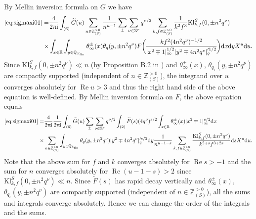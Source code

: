 \documentclass[10pt,oneside,reqno]{amsart}
\makeatletter
\newcommand\rmd{\mathrm{d}}
\newcommand\rmi{\mathrm{i}}
\newcommand\QQ{\mathbb{Q}}
\newcommand\RR{\mathbb{R}}
\newcommand\ZZ{\mathbb{Z}}
\newcommand\dpii{2\uppi\rmi}
\renewcommand\Re{\mathop{\mathrm{Re}}}
\newcommand\fin{\mathrm{fin}}
\newcommand\Kl{\mathrm{Kl}}
\newcommand\legendresymbol[2]{\genfrac{(}{)}{}{}{#1}{#2}}
\theoremstyle{THEOREM}
\theoremstyle{DEFINITION}
\theoremstyle{EXERCISE}
\numberwithin{equation}{section}
\renewenvironment{proof}[1][\proofname]{\par
  \vspace{-6pt}
  \pushQED{\qed}
  \normalfont \topsep6\p@\@plus6\p@\relax
  \trivlist
  \item[\hskip\labelsep\rmfamily\bfseries
    #1\@addpunct{:}]\ignorespaces
}{
  \popQED\endtrivlist\@endpefalse
  \vspace{-6pt}
}
\makeatother
\begin{document}
\begin{proof}
By Mellin inversion formula on $G$ we have
\begin{align*}
\eqref{eq:sigmaxi01}=&\frac{4}{\dpii} \int_{(6)}\widetilde{G}(u)\sum_{n\in \ZZ_{(S)}^{>0}}\frac{1}{n^{u-1}}\sum_{\pm}\sum_{\nu\in \ZZ^r}q^{\nu/2}\sum_{k,f\in \ZZ_{(S)}^{>0}}\frac{1}{k^2f^3}\Kl_{k,f}^S(0,\pm n^2q^\nu)\\
  \times&\int_{x\in\RR}\int_{y\in\QQ_{S_\fin}}\theta_\infty^\pm(x)\theta_{q}(y,\pm n^2q^\nu)  F\legendresymbol{kf^2(4n^2q^\nu)^{-1/2}}{|x^2\mp 1|_\infty^{1/2}|y^2\mp 4n^2q^\nu|_q'^{1/2}}\rmd x\rmd y X^u\rmd u.
\end{align*}
Since $\Kl_{k,f}^S(0,\pm n^2q^\nu)\ll n$ (by Proposition B.2 in \cite{cheng2025b}) and $\theta_\infty^\pm(x)$, $\theta_{q_i}(y,\pm n^2q^\nu)$ are compactly supported (independent of $n\in \ZZ_{(S)}^{>0}$), the integrand over $u$ converges absolutely for $\Re u>3$ and thus the right hand side of the above equation is well-defined. By Mellin inversion formula on $F$, the above equation equals
\begin{align*}
\eqref{eq:sigmaxi01}=&\frac{4}{\dpii}\frac{1}{\dpii} \int_{(6)}\widetilde{G}(u)\sum_{\pm}\sum_{\nu\in \ZZ^r}q^{\nu/2}\int_{(2)}\widetilde{F}(s)(4q^\nu)^{s/2}\int_{x\in\RR}\theta_\infty^\pm(x)|x^2\mp 1|_\infty^{s/2}\rmd x\\
  \times& \sum_{n\in \ZZ_{(S)}^{>0}}\int_{y\in\QQ_{S_\fin}}\theta_{q}(y,\pm n^2q^\nu)|y^2\mp 4n^2q^\nu|_q'^{s/2}\rmd y \frac{1}{n^{u-1-s}}\sum_{k,f\in \ZZ_{(S)}^{>0}}\frac{\Kl_{k,f}^S(0,\pm n^2q^\nu)}{k^{2+s}f^{3+2s}}\rmd s X^u\rmd u.
\end{align*}
Note that the above sum for $f$ and $k$ converges absolutely for $\Re s>-1$ and the sum for $n$ converges absolutely for $\Re (u-1-s)>2$ since $\Kl_{k,f}^S(0,\pm n^2q^\nu)\ll n$. Since $\widetilde{F}(s)$ has rapid decay vertically and $\theta_\infty^\pm(x)$, $\theta_{q_i}(y,\pm n^2q^\nu)$ are compactly supported (independent of $n\in \ZZ_{(S)}^{>0}$), all the sums and integrals converge absolutely.
Hence we can change the order of the integrals and the sums. 


\end{proof}
\end{document}
